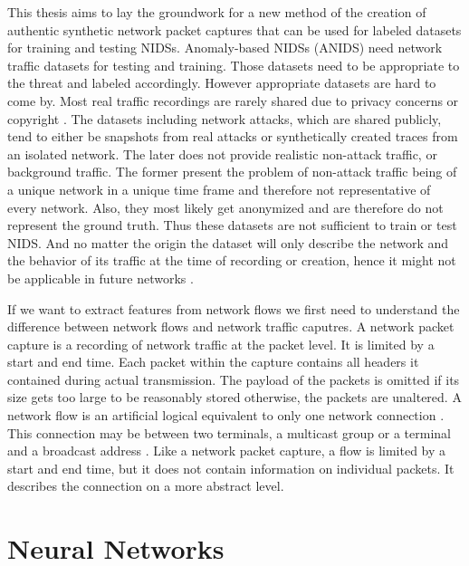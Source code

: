 \documentclass[
	ngerman,
	ruledheaders=section,%
	class=report,%
	thesis={type=bachelor},%
	accentcolor=9c,%
	custommargins=true,%
	marginpar=false,%
	parskip=half-,%
	fontsize=11pt,%
]{tudapub}
\begin{document}
This thesis aims to lay the groundwork for a new method of the creation of authentic synthetic network packet captures
that can be used for labeled datasets for training and testing NIDSs.
Anomaly-based NIDSs (ANIDS) need network traffic datasets for testing and training.
Those datasets need to be appropriate to the threat and labeled accordingly.
However appropriate datasets are hard to come by.
Most real traffic recordings are rarely shared due to privacy concerns \cite{ringFlowbasedNetworkTraffic2019a} or copyright \cite{corderoID2TDIYDataset2015}.
The datasets including network attacks,
which are shared publicly,
tend to either be snapshots from real attacks or synthetically created traces from an isolated network.
The later does not provide realistic non-attack traffic, or background traffic.
The former present the problem of non-attack traffic being of a unique network in a unique time frame and therefore not representative of every network.
Also, they most likely get anonymized and are therefore do not represent the ground truth.
Thus these datasets are not sufficient to train or test NIDS.
And no matter the origin the dataset will only describe the network and the behavior of its traffic at the time of recording or creation, hence it might not be applicable in future networks \cite{ringFlowbasedNetworkTraffic2019a}.

If we want to extract features from network flows
we first need to understand the difference between network flows and network traffic caputres.
A network packet capture is a recording of network traffic at the packet level.
It is limited by a start and end time.
Each packet within the capture contains all headers it contained during actual transmission.
The payload of the packets is omitted if its size gets too large to be reasonably stored otherwise, the packets are unaltered.
A network flow is an artificial logical equivalent to only one network connection \cite{brownleeTrafficFlowMeasurement}.
This connection may be between two terminals, a multicast group or a terminal and a broadcast address \cite{rajahalmeIPv6FlowLabel}.
Like a network packet capture, a flow is limited by a start and end time,
but it does not contain information on individual packets.
It describes the connection on a more abstract level.



\section{Neural Networks}
\end{document}
